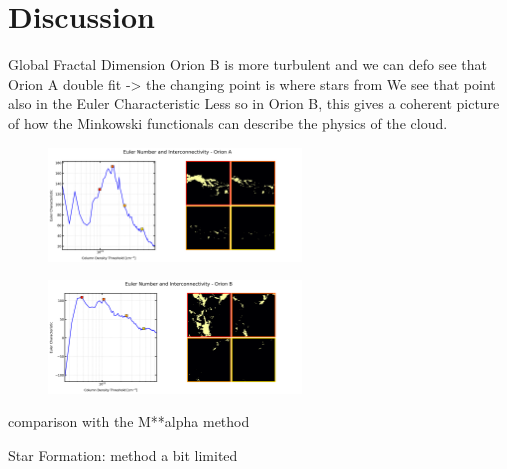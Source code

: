 \chapter{Discussion}

Global Fractal Dimension 
Orion B is more turbulent and we can defo see that 
Orion A double fit -> the changing point is where stars from
We see that point also in the Euler Characteristic
Less so in Orion B, this gives a coherent picture of how the Minkowski functionals can describe the physics of the cloud.

\begin{figure}[t]
    \centering
    \includegraphics[width=0.6\textwidth]{figures/euler_Orion_A.png}
    \caption{}
    \label{fig:Euler_Orion_A}
\end{figure}

\begin{figure}[t]
    \centering
    \includegraphics[width=0.6\textwidth]{figures/euler_Orion_B.png}
    \caption{}
    \label{fig:Euler_Orion_B}
\end{figure}

comparison with the M**alpha method

Star Formation: method a bit limited 